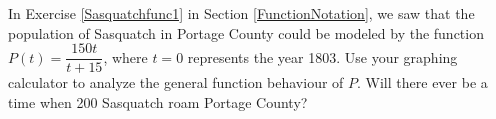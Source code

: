 {In Exercise \ref{Sasquatchfunc1} in Section \ref{FunctionNotation}, we saw that the population of Sasquatch in Portage County could be modeled by the function $P(t) = \dfrac{150t}{t + 15}$, where $t = 0$ represents the year 1803. Use your graphing calculator to analyze the general function behaviour of $P$.  Will there ever be a time when 200 Sasquatch roam Portage County?}
{}